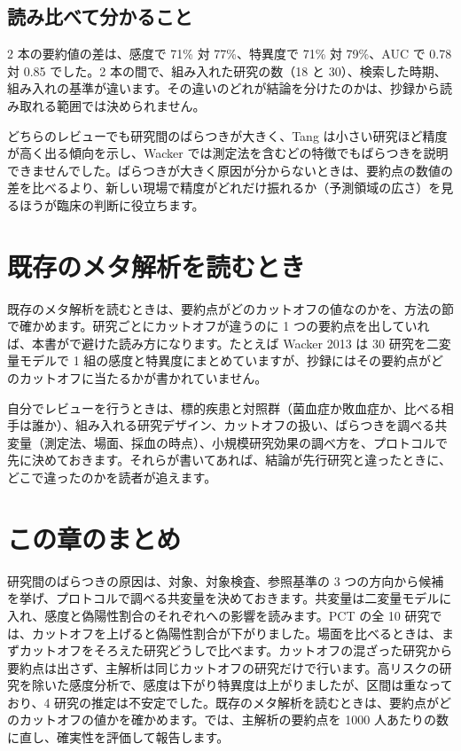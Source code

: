 \subsection{\hatten 読み比べて分かること}
\label{sec:14-7-3}

2 本の要約値の差は、感度で 71\% 対 77\%、特異度で 71\% 対 79\%、AUC で 0.78 対 0.85 でした。2 本の間で、組み入れた研究の数（18 と 30）、検索した時期、組み入れの基準が違います。その違いのどれが結論を分けたのかは、抄録から読み取れる範囲では決められません。

どちらのレビューでも研究間のばらつきが大きく、Tang は小さい研究ほど精度が高く出る傾向を示し、Wacker では測定法を含むどの特徴でもばらつきを説明できませんでした。ばらつきが大きく原因が分からないときは、要約点の数値の差を比べるより、新しい現場で精度がどれだけ振れるか（予測領域の広さ）を見るほうが臨床の判断に役立ちます。

\section{既存のメタ解析を読むとき}
\label{sec:14-8}

既存のメタ解析を読むときは、要約点がどのカットオフの値なのかを、方法の節で確かめます。研究ごとにカットオフが違うのに 1 つの要約点を出していれば、本書がで避けた読み方になります。たとえば Wacker 2013 は 30 研究を二変量モデルで 1 組の感度と特異度にまとめていますが、抄録にはその要約点がどのカットオフに当たるかが書かれていません。

自分でレビューを行うときは、標的疾患と対照群（菌血症か敗血症か、比べる相手は誰か）、組み入れる研究デザイン、カットオフの扱い、ばらつきを調べる共変量（測定法、場面、採血の時点）、小規模研究効果の調べ方を、プロトコルで先に決めておきます。それらが書いてあれば、結論が先行研究と違ったときに、どこで違ったのかを読者が追えます。

\section{この章のまとめ}
\label{sec:14-9}

研究間のばらつきの原因は、対象、対象検査、参照基準の 3 つの方向から候補を挙げ、プロトコルで調べる共変量を決めておきます。共変量は二変量モデルに入れ、感度と偽陽性割合のそれぞれへの影響を読みます。PCT の全 10 研究では、カットオフを上げると偽陽性割合が下がりました。場面を比べるときは、まずカットオフをそろえた研究どうしで比べます。カットオフの混ざった研究から要約点は出さず、主解析は同じカットオフの研究だけで行います。高リスクの研究を除いた感度分析で、感度は下がり特異度は上がりましたが、区間は重なっており、4 研究の推定は不安定でした。既存のメタ解析を読むときは、要約点がどのカットオフの値かを確かめます。では、主解析の要約点を 1000 人あたりの数に直し、確実性を評価して報告します。
